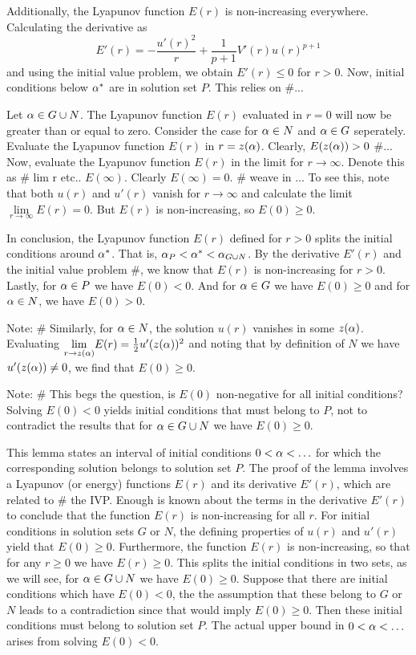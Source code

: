 Additionally, the Lyapunov function $E(r)$ is non-increasing everywhere. Calculating the derivative as $$E'(r)=-\frac{u'(r)^2}{r}+\frac{1}{p+1}V'(r)u(r)^{p+1}$$ and using the initial value problem, we obtain $E'(r)\leq0$ for $r>0$. Now, initial conditions below $\alpha^*$ are in solution set $P$. This relies on \#...  

Let $\alpha\in G\cup N$. The Lyapunov function $E(r)$ evaluated in $r=0$ will now be greater than or equal to zero. Consider the case for $\alpha\in N$ and $\alpha\in G$ seperately. Evaluate the Lyapunov function $E(r)$ in $r=z(\alpha)$. Clearly, $E(z(\alpha))>0$ \#... Now, evaluate the Lyapunov function $E(r)$ in the limit for $r\to\infty$. Denote this as \# lim r etc.. $E(\infty)$. Clearly $E(\infty)=0$. \# weave in ... To see this, note that both $u(r)$ and $u'(r)$ vanish for $r\to\infty$ and calculate the limit $\underset{r\to\infty}{\lim}E(r)=0$. But $E(r)$ is non-increasing, so $E(0)\geq0$.

In conclusion, the Lyapunov function $E(r)$ defined for $r>0$ splits the initial conditions around $\alpha^*$. That is, $\alpha_P<\alpha^*<\alpha_{G\cup N}$. By the derivative $E'(r)$ and the initial value problem \#, we know that $E(r)$ is non-increasing for $r>0$. Lastly, for $\alpha\in P$ we have $E(0)<0$. And for $\alpha\in G$ we have $E(0)\geq0$ and for $\alpha\in N$, we have $E(0)>0$.

Note: \# Similarly, for $\alpha\in N$, the solution $u(r)$ vanishes in some $z(\alpha)$. Evaluating $\underset{r\to z(\alpha)}{\lim}E(r)=\frac{1}{2}u'(z(\alpha))^2$ and noting that by definition of $N$ we have $u'(z(\alpha))\neq0$, we find that $E(0)\geq0$.

Note: \# This begs the question, is $E(0)$ non-negative for all initial conditions? Solving $E(0)<0$ yields initial conditions that must belong to $P$, not to contradict the results that for $\alpha\in G\cup N$ we have $E(0)\geq0$.

This lemma states an interval of initial conditions $0<\alpha<\ldots$ for which the corresponding  solution belongs to solution set $P$. The proof of the lemma involves a Lyapunov (or energy) functions $E(r)$ and its derivative $E'(r)$, which are related to \# the IVP. Enough is known about the terms in the derivative $E'(r)$ to conclude that the function $E(r)$ is non-increasing for all $r$. For initial conditions in solution sets $G$ or $N$, the defining properties of $u(r)$ and $u'(r)$ yield that $E(0)\geq0$. Furthermore, the function $E(r)$ is non-increasing, so that for any $r\geq0$ we have $E(r)\geq0$. This splits the initial conditions in two sets, as we will see, for $\alpha\in G\cup N$ we have $E(0)\geq0$. Suppose that there are initial conditions which have $E(0)<0$, the the assumption that these belong to $G$ or $N$ leads to a contradiction since that would imply $E(0)\geq0$. Then these initial conditions must belong to solution set $P$. The actual upper bound in $0<\alpha<\ldots$ arises from solving $E(0)<0$.

